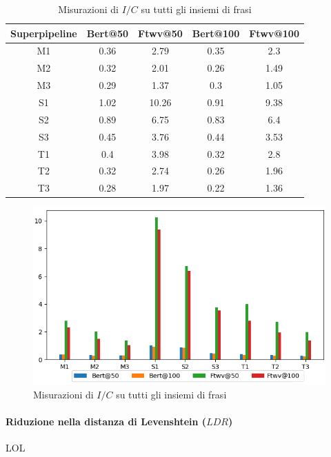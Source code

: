 \begin{table}[H]
\centering
\begin{tabular}{c|cc|cc}
\textbf{Superpipeline} & \textbf{Bert@50} &  \textbf{Ftwv@50} & \textbf{Bert@100} & \textbf{Ftwv@100}\\
\hline
M1& 0.36& 2.79& 0.35& 2.3\\
M2& 0.32& 2.01& 0.26& 1.49\\
M3& 0.29& 1.37& 0.3& 1.05\\
S1& 1.02& 10.26& 0.91& 9.38\\
S2& 0.89& 6.75& 0.83& 6.4\\
S3& 0.45& 3.76& 0.44& 3.53\\
T1& 0.4& 3.98& 0.32& 2.8\\
T2& 0.32& 2.74& 0.26& 1.96\\
T3& 0.28& 1.97& 0.22& 1.36\\
\end{tabular}
\caption{Misurazioni di $I/C$ su tutti gli insiemi di frasi}
\label{fig:test_res_ic_gra}
\end{table}

\begin{figure}[H]
\centering
\includegraphics[width=\textwidth]{immagini/test/ic}
\caption{Misurazioni di $I/C$ su tutti gli insiemi di frasi}
\label{fig:test_res_ic}
\end{figure}









\paragraph{Riduzione nella distanza di Levenshtein ($LDR$)}
LOL


